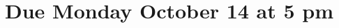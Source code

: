 \documentclass[11pt,fleqn]{article}
\begin{document}
\maketitle
\section*{Due Monday October 14 at 5 pm}










\end{document}
